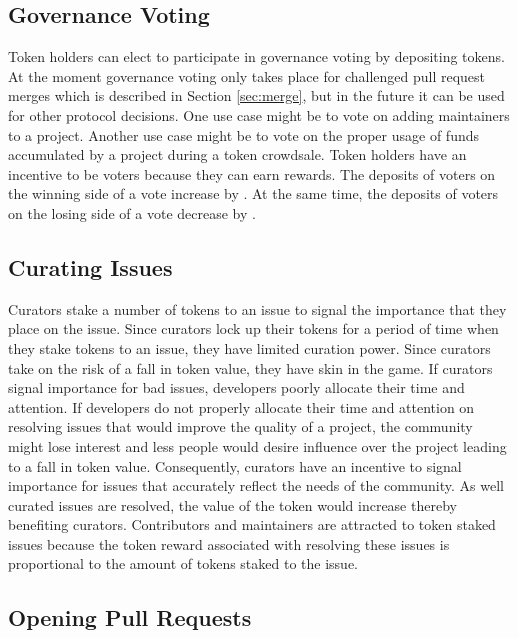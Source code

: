 \subsection{Governance Voting}

Token holders can elect to participate in governance voting by depositing
 tokens. At the moment governance voting only takes place
for challenged pull request merges which is described in Section
\ref{sec:merge}, but in the future it can be used for other
protocol decisions. One use case might be to vote on adding maintainers to a
project. Another use case might be to vote on the proper usage of funds
accumulated by a project during a token crowdsale. Token holders have an
incentive to be voters because they can earn rewards. The deposits of voters on
the winning side of a vote increase by . At the
same time, the deposits of voters on the losing side of a vote decrease by .

\subsection{Curating Issues}

Curators stake a number of tokens to an issue to signal the importance that they
place on the issue. Since curators lock up their tokens for a period of time
when they stake tokens to an issue, they have limited curation power. Since curators take on the risk of a
fall in token value, they have skin in the game\cite{skininthegame}. If curators
signal importance for bad issues, developers poorly allocate their time and
attention. If developers do not properly allocate their time and attention on resolving
issues that would improve the quality of a project, the community might lose
interest and less people would desire influence over the project leading to a
fall in token value. Consequently, curators have an incentive to signal
importance for issues that accurately reflect the needs of the community. As
well curated issues are resolved, the value of the token would increase thereby
benefiting curators. Contributors and maintainers are attracted to token staked
issues because the token reward associated with resolving these issues is
proportional to the amount of tokens staked to the issue.

\subsection{Opening Pull Requests}

